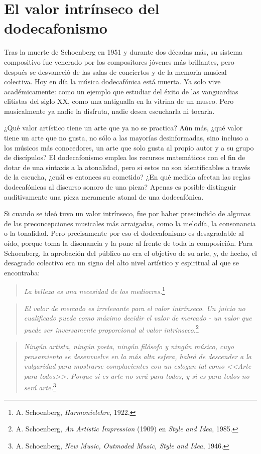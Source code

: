      
	\section{El valor intrínseco del dodecafonismo}
	Tras la muerte de Schoenberg en 1951 y durante dos décadas más, su sistema compositivo fue venerado por los compositores jóvenes más brillantes, pero después se desvaneció de las salas de conciertos y de la memoria musical colectiva. Hoy en día la música dodecafónica está muerta. Ya solo vive académicamente: como un ejemplo que estudiar del éxito de las vanguardias elitistas del siglo XX, como una antigualla en la vitrina de un museo. Pero musicalmente ya nadie la disfruta, nadie desea escucharla ni tocarla.
	
	¿Qué valor artístico tiene un arte que ya no se practica? Aún más, ¿qué valor tiene un arte que no gusta, no sólo a las mayorías desinformadas, sino incluso a los músicos más conocedores, un arte que solo gusta al propio autor y a su grupo de discípulos? El dodecafonismo emplea los recursos matemáticos con el fin de dotar de una sintaxis a la atonalidad, pero si estos no son identificables a través de la escucha, ¿cuál es entonces su cometido? ¿En qué medida afectan las reglas dodecafónicas al discurso sonoro de una pieza? Apenas es posible distinguir auditivamente una pieza meramente atonal de una dodecafónica. \cite{basomba}
	
	Si cuando se ideó tuvo un valor intrínseco, fue por haber prescindido de algunas de las preconcepciones musicales más arraigadas, como la melodía, la consonancia o la tonalidad. Pero precisamente por eso el dodecafonismo es desagradable al oído, porque toma la disonancia y la pone al frente de toda la composición. Para Schoenberg, la aprobación del público no era el objetivo de su arte, y, de hecho, el desagrado colectivo era un signo del alto nivel artístico y espiritual al que se encontraba:
	
	\begin{quote}
		\emph{La belleza es una necesidad de los mediocres.}\footnote{A. Schoenberg, \emph{Harmonielehre}, 1922.}
	\end{quote}
	\begin{quote}
		\emph{El valor de mercado es irrelevante para el valor intrínseco. Un juicio no cualificado puede como máximo decidir el valor de mercado - un valor que puede ser inversamente proporcional al valor intrínseco.}\footnote{A. Schoenberg, \emph{An Artistic Impression} (1909) en \emph{Style and Idea}, 1985.}
	\end{quote}
	\begin{quote}
		\emph{Ningún artista, ningún poeta, ningún filósofo y ningún músico, cuyo pensamiento se desenvuelve en la más alta esfera, habrá de descender a la vulgaridad para mostrarse complacientes con un eslogan tal como <<Arte para todos>>. Porque si es arte no será para todos, y si es para todos no será arte.}\footnote{A. Schoenberg, \emph{New Music, Outmoded Music, Style and Idea}, 1946.}
	\end{quote}
	
